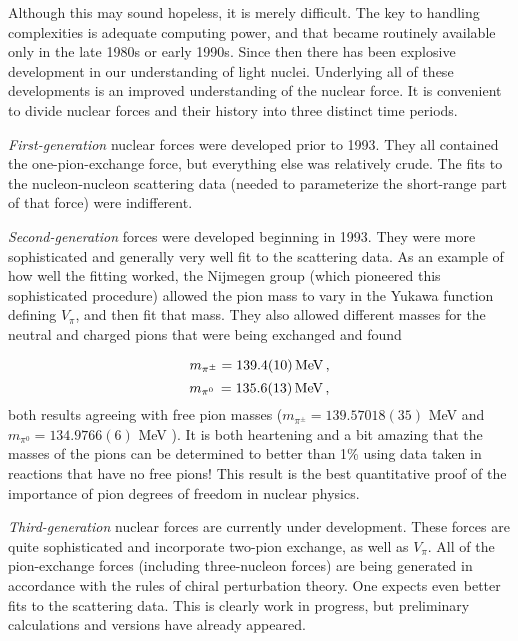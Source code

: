\documentclass{svmult}
\begin{document}
Although this may sound hopeless, it is merely difficult. The key to handling
complexities is adequate computing power, and that became routinely available
only in the late 1980s or early 1990s. Since then there has been explosive
development in our understanding of light nuclei.  Underlying all of these
developments is an improved understanding of the nuclear force.  It is
convenient to divide nuclear forces and their history into three distinct time
periods.

{\it First-generation} nuclear forces were
developed prior to 1993. They all contained the one-pion-exchange force, but
everything else was relatively crude. The fits to the nucleon-nucleon scattering
data (needed to parameterize the short-range part of that force) were
indifferent.

{\it Second-generation} forces were
developed beginning in 1993\cite{2gen}. They were more sophisticated and
generally very well fit to the scattering data.  As an example of how well the
fitting worked, the Nijmegen group (which pioneered this sophisticated
procedure) allowed the pion mass to vary in the Yukawa function defining
$V_{\pi}$, and then fit that mass. They also allowed
different masses for the neutral and charged pions that were being exchanged and
found\cite{pi-mass}

\begin{equation} m_{\pi^\pm} = 139.4(10)\, {\rm MeV} \, , \end{equation}
\begin{equation} m_{\pi^{0}}\, = 135.6(13)\, {\rm MeV} \, , \end{equation} both
results agreeing with free pion masses ($m_{\pi^{\pm}} = 139.57018(35)$ MeV and
$m_{\pi^0} = 134.9766(6)$ MeV \cite{PDG}). It is both heartening and a bit
amazing that the masses of the pions can be determined to better than 1\% using
data taken in reactions that have no free pions!  This result is the best
quantitative proof of the importance of pion degrees of freedom in nuclear
physics.

{\it Third-generation}  nuclear forces are
currently under development. These forces are quite sophisticated and
incorporate two-pion exchange, as well as $V_{\pi}$. 
All of the pion-exchange forces (including three-nucleon
forces) are being generated in accordance 
with the rules of chiral perturbation theory.
One expects even better fits to the scattering data. This is clearly work in
progress, but preliminary calculations and versions have already
appeared\cite{3gen}.
\end{document}
